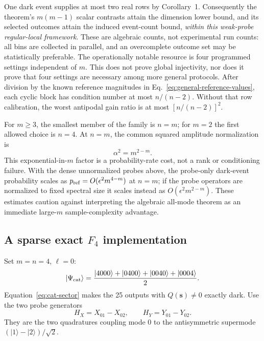 \documentclass[aps,pra,reprint,amsmath,amssymb,superscriptaddress,longbibliography]{revtex4-2}
\begin{document}
One dark event supplies at most two real rows by Corollary~1.  Consequently
the theorem's $m(m-1)$ scalar contrasts attain the dimension lower bound,
and its selected outcomes attain the induced event-count bound,
\emph{within this weak-probe regular-local framework}.  These are algebraic
counts, not experimental run counts: all bins are collected in parallel,
and an overcomplete outcome set may be statistically preferable.  The
operationally notable resource is four programmed settings independent of
$m$.  This does not prove global injectivity, nor does it prove that four
settings are necessary among more general protocols.  After
division by the known reference magnitudes in
Eq.~\eqref{eq:general-reference-values}, each cyclic block has condition
number at most $n/(n-2)$.  Without that row calibration, the worst
antipodal gain ratio is at most $[n/(n-2)]^2$.

For $m\geq3$, the smallest member of the family is $n=m$; for $m=2$ the
first allowed choice is $n=4$.  At $n=m$, the common squared amplitude
normalization is
\begin{equation}
 \alpha^2=m^{2-m}.
\label{eq:alpha-scaling}
\end{equation}
This exponential-in-$m$ factor is a probability-rate cost, not a rank or
conditioning failure.  With the dense unnormalized probes above, the
probe-only dark-event probability scales as
$p_{\rm ref}=O(\epsilon^2m^{4-m})$ at $n=m$; if the probe operators are
normalized to fixed spectral size it scales instead as
$O(\epsilon^2m^{2-m})$.  These estimates caution against interpreting the
algebraic all-mode theorem as an immediate large-$m$ sample-complexity
advantage.

\subsection{A sparse exact $F_4$ implementation}

Set $m=n=4$, $\ell=0$:
\begin{equation}
 |\Psi_{\rm cat}\rangle
 =\frac{|4000\rangle+|0400\rangle+|0040\rangle+|0004\rangle}{2}.
\label{eq:f4-cat}
\end{equation}
Equation~\eqref{eq:cat-sector} makes the 25 outputs with
$Q(\bm s)\neq0$ exactly dark.  Use the two probe generators
\begin{equation}
 H_X=X_{01}-X_{02},\qquad
 H_Y=Y_{01}-Y_{02}.
\label{eq:cat-probes}
\end{equation}
They are the two quadratures coupling mode $0$ to the antisymmetric
supermode $(|1\rangle-|2\rangle)/\sqrt2$.
\end{document}
